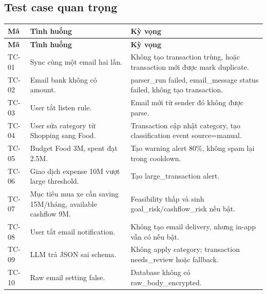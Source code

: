 \documentclass[11pt,a4paper]{article}
\renewcommand{\thead}[1]{\textbf{\color{PrimaryDark}#1}}
\newenvironment{tableblock}{\Needspace{8\baselineskip}\vspace{0.25em}}{\vspace{0.75em}}
\begin{document}
\subsection{Test case quan trọng}
\begin{tableblock}
\scriptsize
\begin{longtable}{L{1.6cm}L{7.2cm}L{6.4cm}}
\thead{Mã} & \thead{Tình huống} & \thead{Kỳ vọng} \\
\endfirsthead
{}\thead{Mã} & \thead{Tình huống} & \thead{Kỳ vọng} \\
\endhead
TC-01 & Sync cùng một email hai lần. & Không tạo transaction trùng, hoặc transaction mới được mark duplicate. \\
TC-02 & Email bank không có amount. & parser\_run failed, email\_message status failed, không tạo transaction. \\
TC-03 & User tắt listen rule. & Email mới từ sender đó không được parse. \\
TC-04 & User sửa category từ Shopping sang Food. & Transaction cập nhật category, tạo classification event source=manual. \\
TC-05 & Budget Food 3M, spent đạt 2.5M. & Tạo warning alert 80\%, không spam lại trong cooldown. \\
TC-06 & Giao dịch expense 10M vượt large threshold. & Tạo large\_transaction alert. \\
TC-07 & Mục tiêu mua xe cần saving 15M/tháng, available cashflow 9M. & Feasibility thấp và sinh goal\_risk/cashflow\_risk nếu bật. \\
TC-08 & User tắt email notification. & Không tạo email delivery, nhưng in-app vẫn có nếu bật. \\
TC-09 & LLM trả JSON sai schema. & Không apply category; transaction needs\_review hoặc fallback. \\
TC-10 & Raw email setting false. & Database không có raw\_body\_encrypted. \\
\end{longtable}
\end{tableblock}
\end{document}
